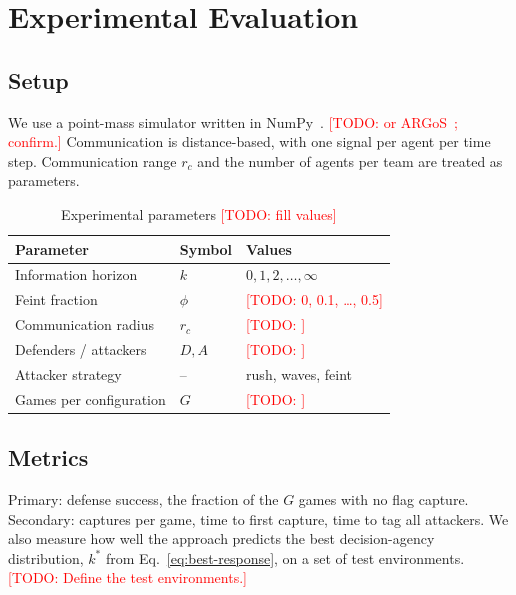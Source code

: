 \documentclass[conference]{IEEEtran}
\newcommand{\todo}[1]{\textcolor{red}{[TODO: #1]}}
\newcommand{\nD}{D}            %
\newcommand{\nA}{A}            %
\newcommand{\nG}{G}            %
\newcommand{\hor}{k}           %
\newcommand{\feint}{\phi}      %
\newcommand{\crange}{r_c}      %
\begin{document}
\section{Experimental Evaluation}
\label{sec:eval}

\subsection{Setup}
We use a point-mass simulator written in NumPy~\cite{swarmctfrepo}. \todo{or ARGoS~\cite{pinciroli2012argos}; confirm.}
Communication is distance-based, with one signal per agent per time step. Communication range $\crange$ and the number of agents per team are treated as parameters.

\begin{table}[t]
  \centering
  \caption{Experimental parameters \todo{fill values}}
  \label{tab:params}
  \begin{tabular}{@{}lll@{}}
    \toprule
    Parameter & Symbol & Values \\
    \midrule
    Information horizon       & $\hor$     & $0, 1, 2, \dots, \infty$ \\
    Feint fraction            & $\feint$   & \todo{0, 0.1, \dots, 0.5} \\
    Communication radius      & $\crange$  & \todo{} \\
    Defenders / attackers     & $\nD, \nA$ & \todo{} \\
    Attacker strategy         & --         & rush, waves, feint \\
    Games per configuration   & $\nG$      & \todo{} \\
    \bottomrule
  \end{tabular}
\end{table}

\subsection{Metrics}
Primary: defense success, the fraction of the $\nG$ games with no flag capture. Secondary: captures per game, time to first capture, time to tag all attackers.
We also measure how well the approach predicts the best decision-agency distribution, $\hor^*$ from Eq.~\eqref{eq:best-response}, on a set of test environments.
\todo{Define the test environments.}
\end{document}
